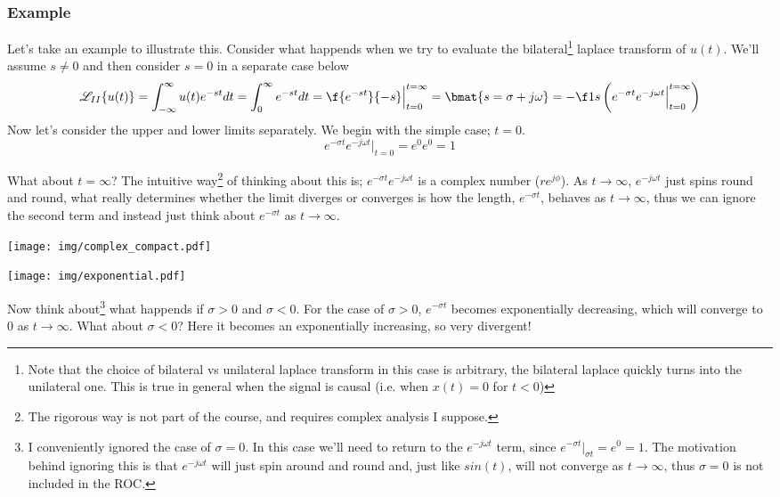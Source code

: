 \documentclass{article}
\newcommand{\0}{{\mathbf{0}}}
\begin{document}
\subsubsection{Example}
Let's take an example to illustrate this.
Consider what happends when we try to evaluate the bilateral\footnote{Note that the choice of bilateral vs unilateral laplace
transform in this case is arbitrary, the bilateral laplace quickly turns into the unilateral one. This is
true in general when the signal is causal (i.e. when $x(t)=0$ for $t<0$)} laplace transform of $u(t)$. We'll assume $s\neq 0$ and
then consider $s=0$ in a separate case below
\begin{equation} \label{eq:laplace}
  \mathscr{L}_{II} \{ u(t) \} = \int^{\infty}_{-\infty} u(t)e^{-st} dt = \int^{\infty}_{0} e^{-st} dt = \f{e^{-st}}{-s} \Big|^{t=\infty}_{t=0} = \bmat{s = \sigma + j\omega} = -\f 1s \left( e^{-\sigma t}e^{-j \omega t} \Big|_{t=0}^{t=\infty} \right)
\end{equation}
Now let's consider the upper and lower limits separately. We begin with the simple case; $t=0$.
$$ e^{-\sigma t}e^{-j \omega t}\Big|_{t=0} = e^{0}e^{0} = 1 $$

What about $t=\infty$?
The intuitive way\footnote{The rigorous way is not part of the course, and requires complex analysis I suppose.} of thinking about this is; $e^{-\sigma t}e^{-j\omega t}$ is a complex number ($re^{j\phi}$).
As $t\to \infty$, $e^{-j \omega t}$
just spins round and round, what really determines whether the limit diverges or converges is how the length, $e^{-\sigma t}$, behaves
as $t\to \infty$, thus we can ignore the second term and instead just think about $e^{-\sigma t}$ as $t\to \infty$.

\begin{center}
  \texttt{[image: img/complex\_compact.pdf]}
\end{center}

\clearpage
\begin{center}
  \texttt{[image: img/exponential.pdf]}
\end{center}

Now think about\footnote{I conveniently ignored the case of $\sigma = 0$. In this case we'll need to return to the $e^{-j\omega t}$ term, since $e^{-\sigma t}\Big|_{\sigma t} = e^0 = 1$. The motivation
behind ignoring this is that $e^{-j\omega t}$ will just spin around and round and, just like $sin(t)$, will not converge as $t\to \infty$, thus $\sigma = 0$ is not included in the ROC.} what happends if $\sigma > 0$ and $\sigma < 0$. For the case of $\sigma > 0$, $e^{-\sigma t}$
becomes exponentially decreasing, which will converge to $0$ as $t \to \infty$. What about $\sigma < 0$?
Here it becomes an exponentially increasing, so very divergent!
\end{document}
